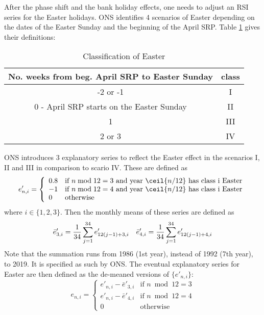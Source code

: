 \documentclass[a4paper,11pt,pdftex,twoside,titlepage]{article}
\begin{document}
After the phase shift and the bank holiday effects, one needs to
adjust an RSI series for the Easter holidays. ONS identifies 4
scenarios of Easter depending on the dates of the Easter Sunday and
the beginning of the April SRP. Table \ref{tab:fth5} gives their
definitions:
\begin{table}[htb!]
  \centering
  \begin{tabular}{c|c}
    No. weeks from beg. April SRP to Easter Sunday & class \\
    \hline \hline
    -2 or -1 & I \\
    \hline
    0 - April SRP starts on the Easter Sunday & II \\
    \hline
    1 & III \\
    \hline
    2 or 3 & IV
  \end{tabular}
  \caption{Classification of Easter}
  \label{tab:fth5}
\end{table}

ONS introduces 3 explanatory series to reflect the Easter effect in
the scenarios I, II and III in comparison to scario IV. These are
defined as
\[
  e'_{n, i} = \left\{
    \begin{array}{ll}
      0.8 & \text{if } n \bmod{12} = 3
            \text{ and year } \ceil{n/12} \text{ has class i Easter} \\
      -1 & \text{if } n \bmod{12} = 4
           \text{ and year } \ceil{n/12} \text{ has class i Easter} \\
      0 & \text{otherwise}
    \end{array}
  \right.
\]
where $i \in \{1, 2, 3\}$. Then the monthly means of these series
are defined as
\[
  \bar e'_{3, i} = {1 \over 34} \sum_{j=1}^{34} e'_{12(j-1)+3, i}
  \quad
  \bar e'_{4, i} = {1 \over 34} \sum_{j=1}^{34} e'_{12(j-1)+4, i}  
\]
Note that the summation runs from 1986 (1st year), instead of 1992
(7th year), to 2019. It is specified as such by ONS. The eventual
explanatory series for Easter are then defined as the de-meaned
versions of $\{e'_{n,i}\}$:
\[
  e_{n, i} = \left\{
      \begin{array}{ll}
        e'_{n, i} - \bar e'_{3,i} & \text{if } n \bmod{12} = 3 \\
        e'_{n, i} - \bar e'_{4,i} & \text{if } n \bmod{12} = 4 \\
        0 & \text{otherwise}
      \end{array}
    \right.
\]
\end{document}
